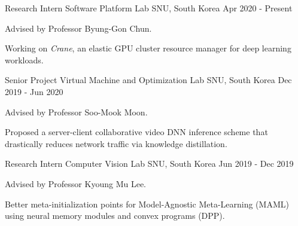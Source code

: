 

\begin{cventries}

  \cventry
    {Research Intern} %
    {Software Platform Lab} %
    {SNU, South Korea} %
    {Apr 2020 - Present} %
    {
      \begin{cvitems} %
        \item {Advised by Professor Byung-Gon Chun.}
        \item {Working on \textit{Crane}, an elastic GPU cluster resource manager for deep learning workloads.}
      \end{cvitems}
    }
    
  \cventry
    {Senior Project} %
    {Virtual Machine and Optimization Lab} %
    {SNU, South Korea} %
    {Dec 2019 - Jun 2020} %
    {
      \begin{cvitems} %
        \item {Advised by Professor Soo-Mook Moon.}
        \item {Proposed a server-client collaborative video DNN inference scheme that drastically reduces network traffic via knowledge distillation.}
      \end{cvitems}
    }
    
  \cventry
    {Research Intern} %
    {Computer Vision Lab} %
    {SNU, South Korea} %
    {Jun 2019 - Dec 2019} %
    {
      \begin{cvitems} %
        \item {Advised by Professor Kyoung Mu Lee.}
        \item {Better meta-initialization points for Model-Agnostic Meta-Learning (MAML) using neural memory modules and convex programs (DPP).}
      \end{cvitems}
    }
    

\end{cventries}
